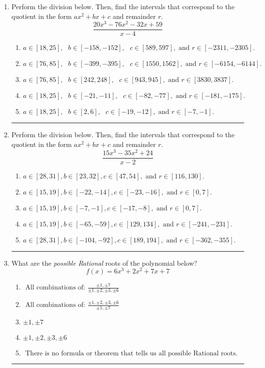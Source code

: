 \documentclass[14pt]{extbook}
\newcommand{\litem}[1]{\item#1\hspace*{-1cm}\rule{\textwidth}{0.4pt}}
\begin{document}
\begin{enumerate}
{\begin{enumerate}[label=\Alph*.]
\end{enumerate} }
\litem{
Perform the division below. Then, find the intervals that correspond to the quotient in the form $ax^2+bx+c$ and remainder $r$.\[ \frac{20x^{3} -76 x^{2} -32 x + 59}{x -4} \]\begin{enumerate}[label=\Alph*.]
\item \( a \in [18, 25], \text{   } b \in [-158, -152], \text{   } c \in [589, 597], \text{   and   } r \in [-2311, -2305]. \)
\item \( a \in [76, 85], \text{   } b \in [-399, -395], \text{   } c \in [1550, 1562], \text{   and   } r \in [-6154, -6144]. \)
\item \( a \in [76, 85], \text{   } b \in [242, 248], \text{   } c \in [943, 945], \text{   and   } r \in [3830, 3837]. \)
\item \( a \in [18, 25], \text{   } b \in [-21, -11], \text{   } c \in [-82, -77], \text{   and   } r \in [-181, -175]. \)
\item \( a \in [18, 25], \text{   } b \in [2, 6], \text{   } c \in [-19, -12], \text{   and   } r \in [-7, -1]. \)

\end{enumerate} }
\litem{
Perform the division below. Then, find the intervals that correspond to the quotient in the form $ax^2+bx+c$ and remainder $r$.\[ \frac{15x^{3} -35 x^{2} + 24}{x -2} \]\begin{enumerate}[label=\Alph*.]
\item \( a \in [28, 31], b \in [23, 32], c \in [47, 54], \text{ and } r \in [116, 130]. \)
\item \( a \in [15, 19], b \in [-22, -14], c \in [-23, -16], \text{ and } r \in [0, 7]. \)
\item \( a \in [15, 19], b \in [-7, -1], c \in [-17, -8], \text{ and } r \in [0, 7]. \)
\item \( a \in [15, 19], b \in [-65, -59], c \in [129, 134], \text{ and } r \in [-241, -231]. \)
\item \( a \in [28, 31], b \in [-104, -92], c \in [189, 194], \text{ and } r \in [-362, -355]. \)

\end{enumerate} }
\litem{
What are the \textit{possible Rational} roots of the polynomial below?\[ f(x) = 6x^{3} +2 x^{2} +7 x + 7 \]\begin{enumerate}[label=\Alph*.]
\item \( \text{ All combinations of: }\frac{\pm 1,\pm 7}{\pm 1,\pm 2,\pm 3,\pm 6} \)
\item \( \text{ All combinations of: }\frac{\pm 1,\pm 2,\pm 3,\pm 6}{\pm 1,\pm 7} \)
\item \( \pm 1,\pm 7 \)
\item \( \pm 1,\pm 2,\pm 3,\pm 6 \)
\item \( \text{ There is no formula or theorem that tells us all possible Rational roots.} \)


\end{enumerate}}
\end{enumerate}
\end{document}
